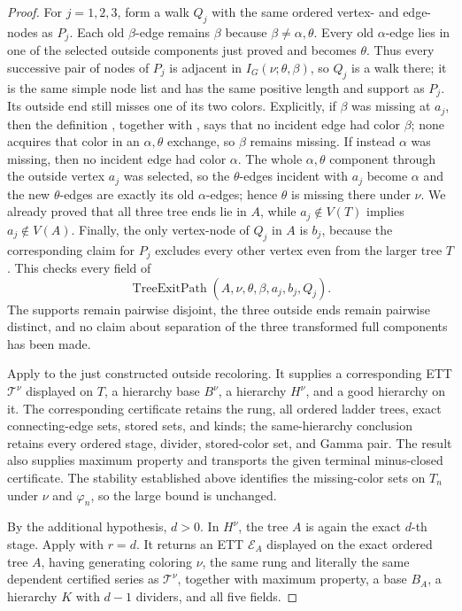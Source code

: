 \begin{proof}
For $j=1,2,3$, form a walk $Q_j$ with the same ordered vertex- and
edge-nodes as $P_j$.  Each old $\beta$-edge remains $\beta$ because
$\beta\ne\alpha,\theta$.  Every old $\alpha$-edge lies in one of the
selected outside components just proved and becomes $\theta$.  Thus
every successive pair of nodes of $P_j$ is adjacent in
$I_G(\nu;\theta,\beta)$, so $Q_j$ is a walk there; it is the same simple
node list and has the same positive length and support as $P_j$.
Its outside end still misses one of its two colors.  Explicitly, if
$\beta$ was missing at $a_j$, then the definition
, together with , says
that no incident edge had color $\beta$; none acquires that color in an
$\alpha,\theta$ exchange, so $\beta$ remains missing.  If instead
$\alpha$ was missing, then no incident edge had color $\alpha$.  The
whole $\alpha,\theta$ component through the outside vertex $a_j$ was
selected, so the $\theta$-edges incident with $a_j$ become $\alpha$ and
the new $\theta$-edges are exactly its old $\alpha$-edges; hence
$\theta$ is missing there under $\nu$.  We already proved that all three
tree ends lie in $A$, while $a_j\notin V(T)$ implies
$a_j\notin V(A)$.  Finally, the only vertex-node of $Q_j$ in $A$ is
$b_j$, because the corresponding claim for $P_j$ excludes every other
vertex even from the larger tree $T$.  This checks every field of
\[
       \operatorname{TreeExitPath}(A,\nu,\theta,\beta,a_j,b_j,Q_j).
       \tag{1}
\]
The supports remain pairwise disjoint, the three outside ends remain
pairwise distinct, and no claim about separation of the three
transformed full components has been made.

Apply  to the just constructed outside
recoloring.  It supplies a corresponding ETT $\mathcal T^\nu$ displayed
on $T$, a hierarchy base $B^\nu$, a hierarchy $H^\nu$, and a good
hierarchy on it.  The corresponding certificate retains the rung, all
ordered ladder trees, exact connecting-edge sets, stored sets, and kinds;
the same-hierarchy conclusion retains every ordered stage, divider,
stored-color set, and Gamma pair.  The result also supplies maximum
property and transports the given terminal minus-closed certificate.
The stability established above identifies the missing-color sets on
$T_n$ under $\nu$ and $\varphi_n$, so the large bound is unchanged.

By the additional hypothesis, $d>0$.  In $H^\nu$, the tree $A$ is again the exact
$d$-th stage.  Apply  with $r=d$.
It returns an ETT $\mathcal E_A$ displayed on the exact ordered tree
$A$, having generating coloring $\nu$, the same rung and literally the
same dependent certified series as $\mathcal T^\nu$, together with
maximum property, a base $B_A$, a hierarchy $K$ with $d-1$ dividers,
and all five  fields.


\end{proof}
